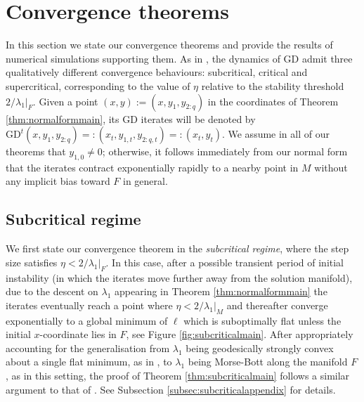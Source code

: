 \documentclass{article}
\newcommand{\GD}{\mathrm{GD}}
\theoremstyle{plain}
\theoremstyle{definition}
\theoremstyle{remark}
\begin{document}
\section{Convergence theorems}\label{sec:convergencetheorems}

In this section we state our convergence theorems and provide the results of numerical simulations supporting them. As in \cite{macdonaldeos}, the dynamics of GD admit three qualitatively different convergence behaviours: subcritical, critical and supercritical, corresponding to the value of $\eta$ relative to the stability threshold $2/\lambda_1|_F$. Given a point $(x,y):=(x,y_1,y_{2:q})$ in the coordinates of Theorem \ref{thm:normalformmain}, its GD iterates will be denoted by $\GD^t(x,y_1,y_{2:q}) =: (x_t,y_{1,t},y_{2:q,t})=:(x_t,y_t)$. We assume in all of our theorems that $y_{1,0}\neq 0$; otherwise, it follows immediately from our normal form that the iterates contract exponentially rapidly to a nearby point in $M$ without any implicit bias toward $F$ in general.

\subsection{Subcritical regime}

We first state our convergence theorem in the \emph{subcritical regime}, where the step size satisfies $\eta<2/\lambda_1|_F$. In this case, after a possible transient period of initial instability (in which the iterates move further away from the solution manifold), due to the descent on $\lambda_1$ appearing in Theorem \ref{thm:normalformmain} the iterates eventually reach a point where $\eta<2/\lambda_1|_M$ and thereafter converge exponentially to a global minimum of $\ell$ which is suboptimally flat unless the initial $x$-coordinate lies in $F$, see Figure \ref{fig:subcriticalmain}. After appropriately accounting for the generalisation from $\lambda_1$ being geodesically strongly convex about a single flat minimum, as in \cite{macdonaldeos}, to $\lambda_1$ being Morse-Bott along the manifold $F$, as in this setting, the proof of Theorem \ref{thm:subcriticalmain} follows a similar argument to that of \cite[Theorem 5.1]{macdonaldeos}. See Subsection \ref{subsec:subcriticalappendix} for details.
\end{document}
